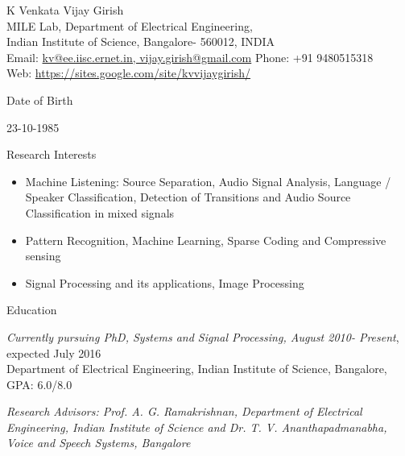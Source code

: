 \documentclass[10pt]{article}
\newenvironment{subbulletlist}{%
	\begin{list}{\labelitemii}{%
		\setlength{\topsep}{\itemsep}\setlength{\parskip}{\parsep}%
	}%
}%
{ \end{list} }
\begin{document}
\newlength{\oldcvlabelwidth}
\newlength{\oldcvlabelsep}

\begin{cv}{{\large K Venkata Vijay Girish}\\
{\normalsize  MILE Lab, Department of Electrical Engineering, \\Indian Institute of Science, Bangalore- 560012, INDIA
\\
Email: {\mdseries \href{mailto:vijay.girish@gmail.com}
	{kv@ee.iisc.ernet.in, vijay.girish@gmail.com}}
\hfill Phone: {\mdseries +91 9480515318} \hfill \\
Web: {\mdseries \href{https://sites.google.com/site/kvvijaygirish/}
	{https://sites.google.com/site/kvvijaygirish/}}}
}

\setlength{\oldcvlabelwidth}{\cvlabelwidth}
\setlength{\oldcvlabelsep}{\cvlabelsep}

\setlength{\cvlabelwidth}{1em}


\setlength{\cvlabelwidth}{0em}
\setlength{\cvlabelsep}{\labelsep}
\begin{cvlist}{Date of Birth}\item
23-10-1985
\end{cvlist}
\begin{cvlist}{Research Interests}\item
\begin{itemize}\itemsep=0.25em
 
 \item Machine Listening: Source Separation, Audio Signal Analysis,  Language / Speaker Classification, Detection of Transitions and Audio Source Classification in mixed signals	 

\item Pattern Recognition, Machine Learning, Sparse Coding and Compressive sensing
\item Signal Processing and its applications, Image Processing
\end{itemize}
\end{cvlist}


\begin{cvlist}{Education}
	\item \emph{Currently pursuing PhD, Systems and Signal Processing, August 2010- Present}, expected July 2016\\
	Department of Electrical
Engineering, Indian Institute of Science, Bangalore, GPA: 6.0/8.0
	\begin{subbulletlist}
		\item \emph{Research Advisors: Prof. A. G. Ramakrishnan, Department of Electrical Engineering, Indian Institute of Science and Dr. T. V. Ananthapadmanabha, Voice and Speech Systems, Bangalore
}
		

\end{subbulletlist}
\end{cvlist}
\end{cv}
\end{document}
